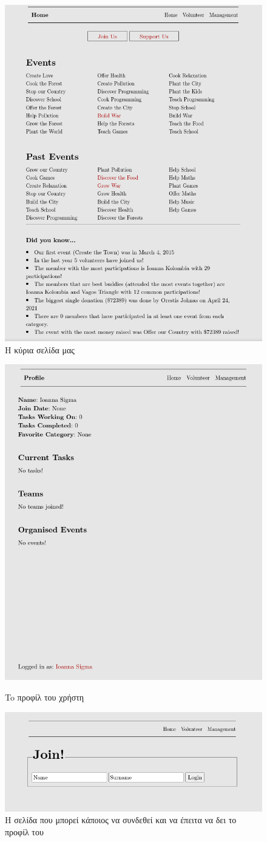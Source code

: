 \documentclass[manuscript,screen,review]{acmart}
\begin{document}
\begin{figure}[H]
    \centering
    \includegraphics[width=.7\textwidth]{./images/homepage.png}
    \caption{H κύρια σελίδα μας}
\end{figure}

\begin{figure}[H]
    \centering
    \includegraphics[width=.5\textwidth]{./images/profile.png}
    \caption{To προφίλ του χρήστη}
    \includegraphics[width=.5\textwidth]{./images/join.png}
    \caption{Η σελίδα που μπορεί κάποιος να συνδεθεί και να έπειτα να δει το προφίλ του}
\end{figure}
\end{document}
